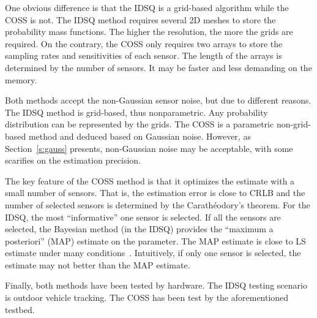 One obvious difference is that the IDSQ is a grid-based algorithm while the COSS is not. The IDSQ method requires several 2D meshes to store the probability mass functions. The higher the resolution, the more the grids are required.
    On the contrary, the COSS only requires two arrays to store the sampling rates and sensitivities of each sensor. The length of the arrays is determined by the number of sensors. It may be faster and less demanding on the memory.

Both methods accept the non-Gaussian sensor noise, but due to different reasons. The IDSQ method is grid-based, thus nonparametric. Any probability distribution can be represented by the grids. The COSS is a parametric non-grid-based method and deduced based on Gaussian noise. However, as Section~\ref{s:gauss} presents, non-Gaussian noise may be acceptable, with some scarifies on the estimation precision.

The key feature of the COSS method is that it optimizes the estimate with a small number of sensors. That is, the estimation error is close to CRLB and the number of selected sensors is determined by the Carath\'{e}odory's theorem. For the IDSQ, the most ``informative'' one sensor is selected. If all the sensors are selected, the Bayesian method (in the IDSQ) provides the ``maximum a posteriori'' (MAP) estimate on the parameter. The MAP estimate is close to LS estimate under many conditions~\cite{EmeryOED98}. Intuitively, if only one sensor is selected, the estimate may not better than the MAP estimate.

Finally, both methods have been tested by hardware. The IDSQ testing scenario is outdoor vehicle tracking. The COSS has been test by the aforementioned testbed.





